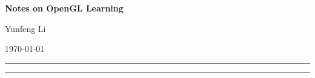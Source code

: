 \documentclass[12pt]{article}
\begin{document}
\begin{center}
{\Large\bf Notes on OpenGL Learning}

Yunfeng Li

\today

\end{center}

\hrule

 \tableofcontents
\vskip 0.5cm \hrule





\end{document}
